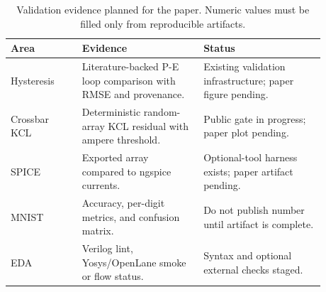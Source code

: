 \begin{table}[ht]
\centering
\caption{Validation evidence planned for the paper. Numeric values must be filled only from reproducible artifacts.}
\label{tab:validation-metrics}
\begin{tabular}{p{0.20\linewidth}p{0.34\linewidth}p{0.34\linewidth}}
\toprule
Area & Evidence & Status \\
\midrule
Hysteresis & Literature-backed P-E loop comparison with RMSE and provenance. & Existing validation infrastructure; paper figure pending. \\
Crossbar KCL & Deterministic random-array KCL residual with ampere threshold. & Public gate in progress; paper plot pending. \\
SPICE & Exported array compared to ngspice currents. & Optional-tool harness exists; paper artifact pending. \\
MNIST & Accuracy, per-digit metrics, and confusion matrix. & Do not publish number until artifact is complete. \\
EDA & Verilog lint, Yosys/OpenLane smoke or flow status. & Syntax and optional external checks staged. \\
\bottomrule
\end{tabular}
\end{table}

